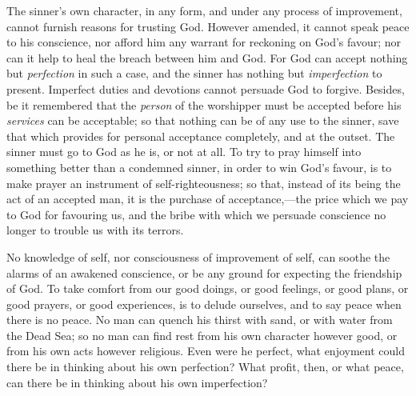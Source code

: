 \documentclass[
]{book}
\begin{document}
The sinner's own character, in any form, and under any process of improvement, cannot furnish reasons for trusting God. However amended, it cannot speak peace to his conscience, nor afford him any warrant for reckoning on God's favour; nor can it help to heal the breach between him and God. For God can accept nothing but \emph{perfection} in such a case, and the sinner has nothing but \emph{imperfection} to present. Imperfect duties and devotions cannot persuade God to forgive. Besides, be it remembered that the \emph{person} of the worshipper must be accepted before his \emph{services} can be acceptable; so that nothing can be of any use to the sinner, save that which provides for personal acceptance completely, and at the outset. The sinner must go to God as he is, or not at all. To try to pray himself into something better than a condemned sinner, in order to win God's favour, is to make prayer an instrument of self-righteousness; so that, instead of its being the act of an accepted man, it is the purchase of acceptance,---the price which we pay to God for favouring us, and the bribe with which we persuade conscience no longer to trouble us with its terrors.

No knowledge of self, nor consciousness of improvement of self, can soothe the alarms of an awakened conscience, or be any ground for expecting the friendship of God. To take comfort from our good doings, or good feelings, or good plans, or good prayers, or good experiences, is to delude ourselves, and to say peace when there is no peace. No man can quench his thirst with sand, or with water from the Dead Sea; so no man can find rest from his own character however good, or from his own acts however religious. Even were he perfect, what enjoyment could there be in thinking about his own perfection? What profit, then, or what peace, can there be in thinking about his own imperfection?
\end{document}
